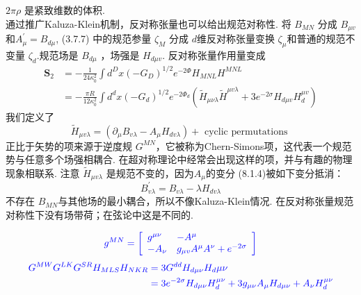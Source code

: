$2 \pi \rho$ 是紧致维数的体积.\\
通过推广Kaluza-Klein机制，反对称张量也可以给出规范对称性. 将 $B_{M N}$ 分成 $B_{\mu v}$和$A_{\mu}^{\prime}=B_{d \mu}$,  (3.7.7) 中的规范参量 $\zeta_{M}$ 分成 $d$维反对称张量变换 $\zeta_{\mu}$和普通的规范不变量 $\zeta_{d}$.规范场是 $B_{d \mu}$ ，场强是 $H_{d \mu v}$. 反对称张量作用量变成
\begin{equation}
	\begin{aligned}
		\boldsymbol{S}_{2} &=-\frac{1}{24 \kappa_{0}^{2}} \int d^{D} x\left(-G_{D}\right)^{1 / 2} e^{-2 \Phi} H_{M N L} H^{M N L} \\
		&=-\frac{\pi R}{12 \kappa_{0}^{2}} \int d^{d} x\left(-G_{d}\right)^{1 / 2} e^{-2 \Phi_{d}}\left(\tilde{H}_{\mu \nu \lambda} \tilde{H}^{\mu v \lambda}+3 e^{-2 \sigma} H_{d \mu v} H_{d}^{\mu v}\right)
	\end{aligned}
\end{equation}
我们定义了
\begin{equation}
	\tilde{H}_{\mu v \lambda}=\left(\partial_{\mu} B_{v \lambda}-A_{\mu} H_{d v \lambda}\right)+\text { cyclic permutations }
\end{equation}
正比于矢势的项来源于逆度规 $G^{M N} $，它被称为Chern-Simons项，这代表一个规范势与任意多个场强相耦合. 在超对称理论中经常会出现这样的项，并与有趣的物理现象相联系. 注意 $\tilde{H}_{\mu v \lambda}$ 是规范不变的，因为$A_{\mu}$的变分 (8.1.4)被如下变分抵消：
\begin{equation}
	B_{v \lambda}^{\prime}=B_{v \lambda}-\lambda H_{d v \lambda}
\end{equation}
不存在 $B_{M N}$与其他场的最小耦合，所以不像Kaluza-Klein情况. 在反对称张量规范对称性下没有场带荷；在弦论中这是不同的.\\
\begin{remark}
$${\color{blue}
g^{M N}=\left[\begin{array}{ll}
g^{\mu \nu} & -A^{\mu} \\
-A_{\nu} & g_{\mu v} A^{\mu} A^{\nu}+e^{-2 \sigma}
\end{array}\right]}
$$
$$\color{blue}
	\begin{aligned}
	G^{M W} G^{L K} G^{S R} H_{M L S} H_{N K R}&=3 G^{d d} H_{d \mu \nu} H_{d} \mu \nu \\
	&=3 e^{-2 \sigma} H_{d \mu \nu} H_{d}^{\mu \nu}+3 g_{\mu \nu} A_{\mu } H_{d\mu \nu}+A_{\nu} H_{d}^{\mu \nu}
	\end{aligned}
	$$
\end{remark}

